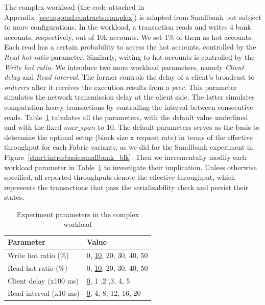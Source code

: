 The complex workload (the code attached in Appendix~\ref{sec:append:contracts:complex}) is adapted from Smallbank but subject to more configurations.
In the workload, a transaction reads and writes 4 bank accounts, respectively, out of 10k accounts.
We set 1\% of them as hot accounts.
Each read has a certain probability to access the
hot accounts, controlled by the \textit{Read hot ratio} parameter. 
Similarly, writing to hot accounts is controlled by the \textit{Write hot ratio}. 
We introduce two more workload parameters, namely \textit{Client delay} and \textit{Read interval}.
The former controls the delay of a client's broadcast to \textit{orderers} after
it receives the execution results from a \textit{peer}.
This parameter simulates the network transmission delay at the client side. 
The latter simulates computation-heavy transactions by controlling the interval
between consecutive reads. 
Table~\ref{tab:txn:parameter} tabulates all the parameters, with the default value underlined and with the fixed $max\_span$ to 10. 
The default parameters serves as the basis to determine the optimal setup (block size x request rate) in terms of the effective throughput for each Fabric variants, as we did for the Smallbank experiment in Figure~\ref{chart:intro:basic:smallbank_blk}. 
Then we incrementally modify each workload parameter in Table~\ref{tab:txn:parameter} to investigate their implication. 
Unless otherwise specified, all reported throughputs denote the effective throughput, which represents the transactions that pass the serializability check and persist their states.

\begin{table}
	\centering
	\caption{Experiment parameters in the complex workload}
	\label{tab:txn:parameter}
	\begin{tabular}{@{}ll@{}}
	\toprule
	\textbf{Parameter}
  & \textbf{Value} \\
	\midrule

  Write hot ratio (\%)
  & 0, \underline{10}, 20, 30, 40, 50 \\

	Read hot ratio (\%)
  & 0, \underline{10}, 20, 30, 40, 50 \\

  Client delay (x100 ms)
  & \underline{0}, 1 ,2 ,3, 4, 5 \\

	Read interval (x10 ms)
  & \underline{0}, 4, 8, 12, 16, 20 \\

	\bottomrule
	\end{tabular}
\end{table}

